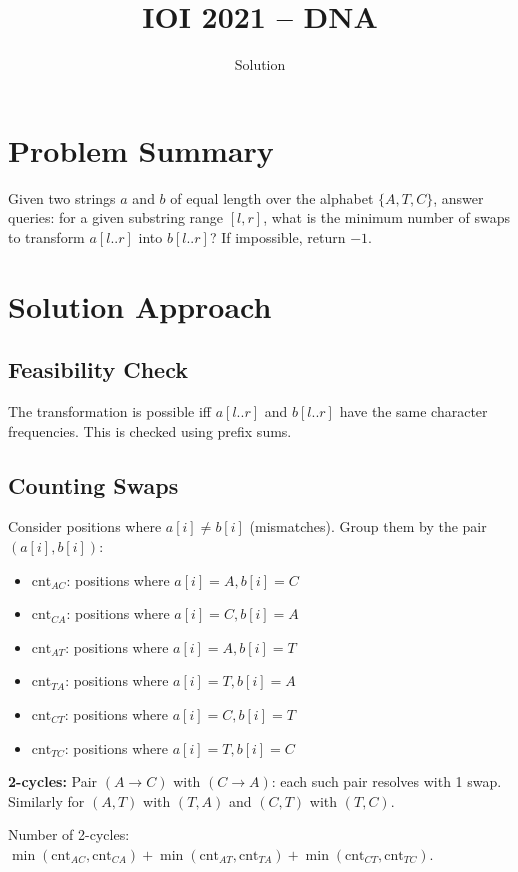 \documentclass[11pt,a4paper]{article}
\title{IOI 2021 -- DNA}
\author{Solution}
\date{}
\begin{document}
\maketitle

\section{Problem Summary}
Given two strings $a$ and $b$ of equal length over the alphabet $\{A, T, C\}$, answer queries: for a given substring range $[l, r]$, what is the minimum number of swaps to transform $a[l..r]$ into $b[l..r]$? If impossible, return $-1$.

\section{Solution Approach}

\subsection{Feasibility Check}
The transformation is possible iff $a[l..r]$ and $b[l..r]$ have the same character frequencies. This is checked using prefix sums.

\subsection{Counting Swaps}
Consider positions where $a[i] \ne b[i]$ (mismatches). Group them by the pair $(a[i], b[i])$:
\begin{itemize}
  \item $\text{cnt}_{AC}$: positions where $a[i] = A, b[i] = C$
  \item $\text{cnt}_{CA}$: positions where $a[i] = C, b[i] = A$
  \item $\text{cnt}_{AT}$: positions where $a[i] = A, b[i] = T$
  \item $\text{cnt}_{TA}$: positions where $a[i] = T, b[i] = A$
  \item $\text{cnt}_{CT}$: positions where $a[i] = C, b[i] = T$
  \item $\text{cnt}_{TC}$: positions where $a[i] = T, b[i] = C$
\end{itemize}

\textbf{2-cycles:} Pair $(A \to C)$ with $(C \to A)$: each such pair resolves with 1 swap. Similarly for $(A,T)$ with $(T,A)$ and $(C,T)$ with $(T,C)$.

Number of 2-cycles: $\min(\text{cnt}_{AC}, \text{cnt}_{CA}) + \min(\text{cnt}_{AT}, \text{cnt}_{TA}) + \min(\text{cnt}_{CT}, \text{cnt}_{TC})$.
\end{document}

